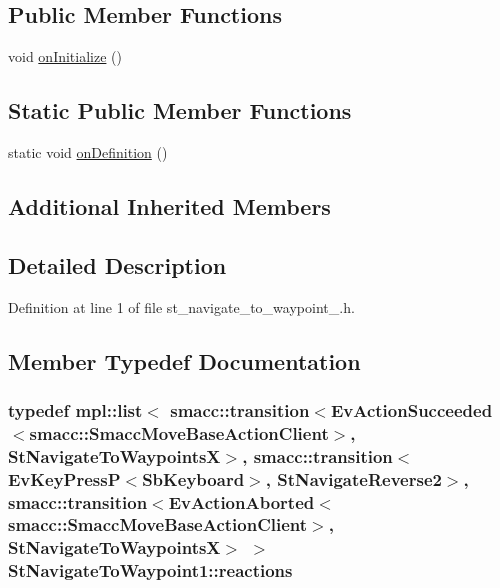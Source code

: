 \subsection*{Public Member Functions}
\begin{DoxyCompactItemize}
\item 
void \hyperlink{structStNavigateToWaypoint1_abf862e4062f5c46d80c0779db4485387}{on\+Initialize} ()
\end{DoxyCompactItemize}
\subsection*{Static Public Member Functions}
\begin{DoxyCompactItemize}
\item 
static void \hyperlink{structStNavigateToWaypoint1_a03056daef3018d51d81cee694ec305ce}{on\+Definition} ()
\end{DoxyCompactItemize}
\subsection*{Additional Inherited Members}


\subsection{Detailed Description}


Definition at line 1 of file st\+\_\+navigate\+\_\+to\+\_\+waypoint\+\_.\+h.



\subsection{Member Typedef Documentation}
\subsubsection[{\texorpdfstring{reactions}{reactions}}]{\setlength{\rightskip}{0pt plus 5cm}typedef mpl\+::list$<$ {\bf smacc\+::transition}$<$Ev\+Action\+Succeeded$<${\bf smacc\+::\+Smacc\+Move\+Base\+Action\+Client}$>$, {\bf St\+Navigate\+To\+WaypointsX}$>$, {\bf smacc\+::transition}$<$Ev\+Key\+PressP$<$Sb\+Keyboard$>$, {\bf St\+Navigate\+Reverse2}$>$, {\bf smacc\+::transition}$<$Ev\+Action\+Aborted$<${\bf smacc\+::\+Smacc\+Move\+Base\+Action\+Client}$>$, {\bf St\+Navigate\+To\+WaypointsX}$>$ $>$ {\bf St\+Navigate\+To\+Waypoint1\+::reactions}}\hypertarget{structStNavigateToWaypoint1_a6db6fed7b236ffe258ec296fc3d73b90}{}\label{structStNavigateToWaypoint1_a6db6fed7b236ffe258ec296fc3d73b90}



